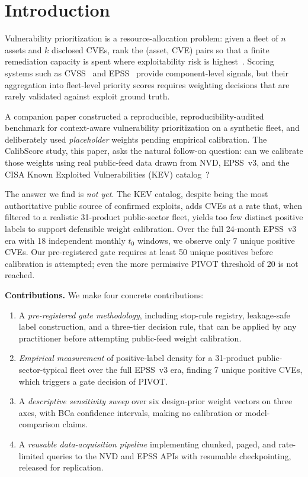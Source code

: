 \documentclass[conference]{IEEEtran}
\begin{document}
\section{Introduction}
\label{sec:intro}

Vulnerability prioritization is a resource-allocation problem: given a
fleet of $n$ assets and $k$ disclosed CVEs, rank the (asset, CVE) pairs so
that a finite remediation capacity is spent where exploitability risk is
highest~\cite{nist80040r4}. Scoring systems such as CVSS~\cite{first_cvss_v31}
and EPSS~\cite{jacobs2021epss} provide component-level signals, but their
aggregation into fleet-level priority scores requires weighting decisions that
are rarely validated against exploit ground truth.

A companion paper constructed a reproducible, reproducibility-audited
benchmark for context-aware vulnerability prioritization on a synthetic fleet,
and deliberately used \emph{placeholder} weights pending empirical calibration.
The CalibScore study, this paper, asks the natural follow-on question: can we calibrate
those weights using real public-feed data drawn from NVD, EPSS~v3, and the CISA
Known Exploited Vulnerabilities (KEV) catalog~\cite{cisa_kev}?

The answer we find is \emph{not yet}. The KEV catalog, despite being the most
authoritative public source of confirmed exploits, adds CVEs at a rate that,
when filtered to a realistic 31-product public-sector fleet, yields too few
distinct positive labels to support defensible weight calibration. Over the
full 24-month EPSS~v3 era with 18 independent monthly $t_0$ windows, we
observe only 7 unique positive CVEs. Our pre-registered gate requires at
least 50 unique positives before calibration is attempted; even the more
permissive PIVOT threshold of 20 is not reached.

\textbf{Contributions.} We make four concrete contributions:
\begin{enumerate}
 \item A \emph{pre-registered gate methodology}, including stop-rule
 registry, leakage-safe label construction, and a three-tier decision
 rule, that can be applied by any practitioner before attempting
 public-feed weight calibration.
 \item \emph{Empirical measurement} of positive-label density for a
 31-product public-sector-typical fleet over the full EPSS~v3 era,
 finding 7 unique positive CVEs, which triggers a gate decision of
 PIVOT.
 \item A \emph{descriptive sensitivity sweep} over six design-prior weight
 vectors on three axes, with BCa confidence intervals, making no
 calibration or model-comparison claims.
 \item A \emph{reusable data-acquisition pipeline} implementing chunked,
 paged, and rate-limited queries to the NVD and EPSS APIs with
 resumable checkpointing, released for replication.
\end{enumerate}
\end{document}
